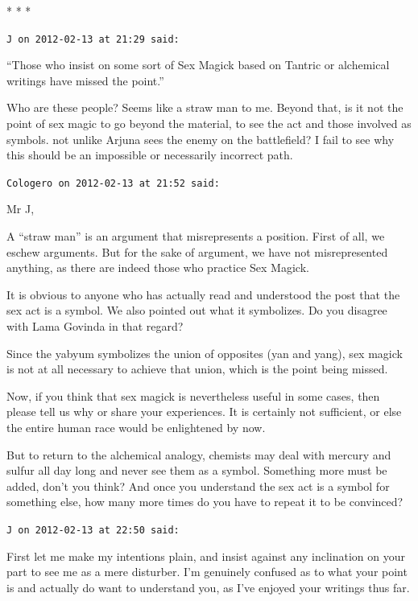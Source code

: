 \begin{center}* * *\end{center}

\begin{footnotesize}
\begin{sffamily}
\texttt{J on 2012-02-13 at 21:29 said:}

``Those who insist on some sort of Sex Magick based on Tantric or alchemical writings have missed the point.''

Who are these people? Seems like a straw man to me. Beyond that, is it not the point of sex magic to go beyond the material, to see the act and those involved as symbols. not unlike Arjuna sees the enemy on the battlefield? I fail to see why this should be an impossible or necessarily incorrect path.

\hfill

\texttt{Cologero on 2012-02-13 at 21:52 said:}

Mr J,

A ``straw man'' is an argument that misrepresents a position. First of all, we eschew arguments. But for the sake of argument, we have not misrepresented anything, as there are indeed those who practice Sex Magick.

It is obvious to anyone who has actually read and understood the post that the sex act is a symbol. We also pointed out what it symbolizes. Do you disagree with Lama Govinda in that regard?

Since the yabyum symbolizes the union of opposites (yan and yang), sex magick is not at all necessary to achieve that union, which is the point being missed.

Now, if you think that sex magick is nevertheless useful in some cases, then please tell us why or share your experiences. It is certainly not sufficient, or else the entire human race would be enlightened by now.

But to return to the alchemical analogy, chemists may deal with mercury and sulfur all day long and never see them as a symbol. Something more must be added, don't you think? And once you understand the sex act is a symbol for something else, how many more times do you have to repeat it to be convinced?

\hfill

\texttt{J on 2012-02-13 at 22:50 said:}

First let me make my intentions plain, and insist against any inclination on your part to see me as a mere disturber. I'm genuinely confused as to what your point is and actually do want to understand you, as I've enjoyed your writings thus far.


\end{sffamily}
\end{footnotesize}
